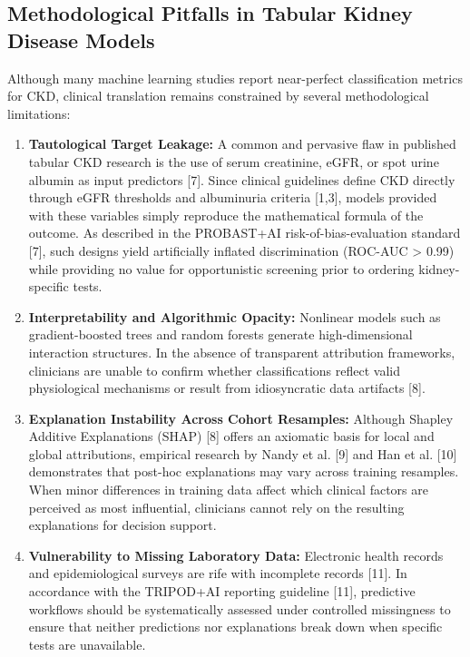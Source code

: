 \documentclass[runningheads]{llncs}
\begin{document}
\subsection{Methodological Pitfalls in Tabular Kidney Disease Models}
Although many machine learning studies report near-perfect classification metrics for CKD, clinical translation remains constrained by several methodological limitations:
\begin{enumerate}
    \item \textbf{Tautological Target Leakage:} A common and pervasive flaw in published tabular CKD research is the use of serum creatinine, eGFR, or spot urine albumin as input predictors [7]. Since clinical guidelines define CKD directly through eGFR thresholds and albuminuria criteria [1,3], models provided with these variables simply reproduce the mathematical formula of the outcome. As described in the PROBAST+AI risk-of-bias-evaluation standard [7], such designs yield artificially inflated discrimination (ROC-AUC > 0.99) while providing no value for opportunistic screening prior to ordering kidney-specific tests.
    \item \textbf{Interpretability and Algorithmic Opacity:} Nonlinear models such as gradient-boosted trees and random forests generate high-dimensional interaction structures. In the absence of transparent attribution frameworks, clinicians are unable to confirm whether classifications reflect valid physiological mechanisms or result from idiosyncratic data artifacts [8].
    \item \textbf{Explanation Instability Across Cohort Resamples:} Although Shapley Additive Explanations (SHAP) [8] offers an axiomatic basis for local and global attributions, empirical research by Nandy et al. [9] and Han et al. [10] demonstrates that post-hoc explanations may vary across training resamples. When minor differences in training data affect which clinical factors are perceived as most influential, clinicians cannot rely on the resulting explanations for decision support.
    \item \textbf{Vulnerability to Missing Laboratory Data:} Electronic health records and epidemiological surveys are rife with incomplete records [11]. In accordance with the TRIPOD+AI reporting guideline [11], predictive workflows should be systematically assessed under controlled missingness to ensure that neither predictions nor explanations break down when specific tests are unavailable.
\end{enumerate}
\end{document}
